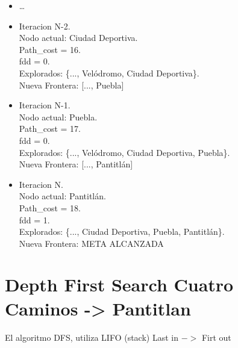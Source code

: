 \documentclass[10pt,a4paper]{article}
\begin{document}
\begin{itemize}
    \item \dots
    
    \item Iteracion N-2.\\
    Nodo actual: Ciudad Deportiva.\\
    Path\_cost = 16.\\
    fdd = 0.\\
    Explorados: \{..., Velódromo, Ciudad Deportiva\}.\\
    Nueva Frontera: [..., Puebla]

    \item Iteracion N-1.\\
    Nodo actual: Puebla.\\
    Path\_cost = 17.\\
    fdd = 0.\\
    Explorados: \{..., Velódromo, Ciudad Deportiva, Puebla\}.\\
    Nueva Frontera: [..., Pantitlán]

    \item Iteracion N.\\
    Nodo actual: Pantitlán.\\
    Path\_cost = 18.\\
    fdd = 1.\\
    Explorados: \{..., Ciudad Deportiva, Puebla, Pantitlán\}.\\
    Nueva Frontera: META ALCANZADA

\end{itemize}


\newpage
\section{Depth First Search  Cuatro Caminos -> Pantitlan}

\vspace{3mm}

El algoritmo DFS, utiliza LIFO (stack) Last in \(->\) Firt out
\end{document}
